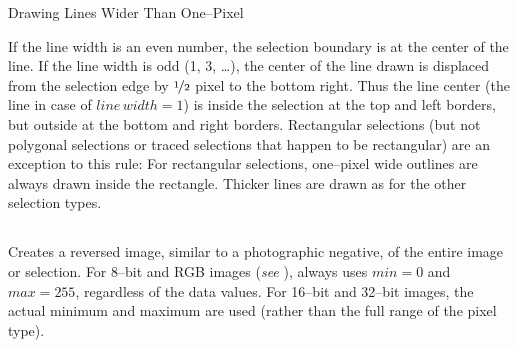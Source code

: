 \noindent \begin{center}
\begin{infobox}
\caption{\label{infobox:Wider-Lines}Drawing Lines Wider Than One--Pixel}


\noindent If the line width is an even number, the selection boundary
is at the center of the line. If the line width is odd (1, 3, \ldots{}),
the center of the line drawn is displaced from the selection edge
by $\nicefrac{1}{2}$ pixel to the bottom right. Thus the line center
(the line in case of $line\, width=1$) is inside the selection at
the top and left borders, but outside at the bottom and right borders.
Rectangular selections (but not polygonal selections or traced selections
that happen to be rectangular) are an exception to this rule: For
rectangular selections, one--pixel wide outlines are always drawn
inside the rectangle. Thicker lines are drawn as for the other selection
types.
\end{infobox}

\par\end{center}


\subsection{\protect{}\label{sub:Invert-[I]}}

Creates a reversed image, similar to a photographic negative, of the
entire image or selection. For 8--bit and RGB images (\emph{see} ),
 always uses $min=0$ and $max=255$, regardless
of the data values. For 16--bit and 32--bit images, the actual minimum
and maximum are used (rather than the full range of the pixel type).




\subsection[\protect\userinterface{Selection\lyxarrow{}}]{\protect{}\label{sub:SelectionSubMenu}}

